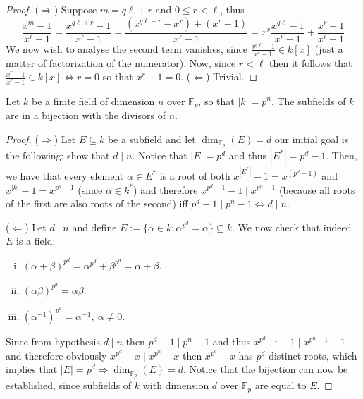 \begin{proof}
   (\(\Rightarrow\)) Suppose \(m = q\ell + r\) and  \(0 \leqslant r < \ell\),
   thus
   \[
      \frac{x^m - 1}{x^\ell - 1} = \frac{x^{q\ell + r} - 1}{x^\ell - 1} 
      = \frac{(x^{q \ell + r} - x^r) + (x^r - 1)}{x^\ell - 1} 
      = x^r\frac{x^{q\ell} - 1}{x^\ell - 1} + \frac{x^r - 1}{x^\ell - 1}
   \] 
   We now wish to analyse the second term vanishes, since \(\frac{x^{q\ell} -
   1}{x^\ell - 1} \in k[x]\) (just a matter of factorization of the numerator).
   Now, since \(r < \ell\) then it follows that \(\frac{x^r - 1}{x^\ell - 1} \in
   k[x] \Leftrightarrow r = 0\) so that \(x^r - 1 = 0\). (\(\Leftarrow\))
   Trivial.
\end{proof}

\begin{proposition}
   Let \(k\) be a finite field of dimension \(n\) over \(\mathbb{F}_p\), so that
   \(|k| = p^n\). The subfields of \(k\) are in a bijection with the divisors of
   \(n\).
\end{proposition}

\begin{proof}
   (\(\Rightarrow\)) Let \(E \subseteq k\) be a subfield and let
   \(\dim_{\mathbb{F}_p}(E) = d\) our initial goal is the following: show that
   \(d \mid n\). Notice that \(|E| = p^d\) and thus \(|E^\ast| = p^d - 1\).
   Then, we have that every element \(\alpha \in E^\ast\) is a root of both
   \(x^{|E^\ast|} - 1 = x^{(p^d - 1)}\) and \(x^{|k|} - 1 = x^{p^n - 1}\) (since
   \(\alpha \in k^\ast\)) and therefore \(x^{p^d - 1}- 1 \mid x^{p^n - 1}\)
   (because all roots of the first are also roots of the second) iff \(p^d - 1
   \mid p^n-1 \Leftrightarrow d \mid n\).

   (\(\Leftarrow\)) Let \(d \mid n\) and define \(E := \{\alpha \in k :
   \alpha^{p^d} = \alpha\} \subseteq k\). We now check that indeed \(E\) is a
   field: 
   \begin{enumerate}[i.]
      \item \((\alpha + \beta)^{p^d} = \alpha^{p^d} + \beta^{p^d} = \alpha +
         \beta\).
      \item \((\alpha\beta)^{p^d} = \alpha\beta\).
      \item \((\alpha^{-1})^{p^d} = \alpha^{-1},\ \alpha \neq 0\).
   \end{enumerate}
   Since from hypothesis \(d \mid n\) then \(p^d - 1 \mid p^n - 1\) and thus
   \(x^{p^d-1}- 1 \mid x^{p^n-1}-1\) and therefore obviously \(x^{p^d} - x \mid
   x^{p^n} - x\) then \(x^{p^d} - x\) has \(p^d\) distinct roots, which implies
   that \(|E| = p^d \Rightarrow \dim_{\mathbb{F}_p}(E) = d\). Notice that the
   bijection can now be established, since subfields of \(k\) with dimension
   \(d\) over \(\mathbb{F}_p\) are equal to \(E\).
\end{proof}


